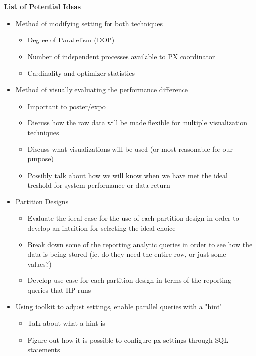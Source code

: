 \documentclass[draftclsnofoot, onecolumn, compsoc, 10pt]{IEEEtran}
\begin{document}
\textbf{List of Potential Ideas}
\begin{itemize} 
	\item  Method of modifying setting for both techniques
    \begin{itemize} 
		\item Degree of Parallelism (DOP) 
        \item Number of independent processes available to PX coordinator
        \item Cardinality and optimizer statistics
    \end{itemize}
    \item Method of visually evaluating the performance difference
    \begin{itemize} 
		\item Important to poster/expo
        \item Discuss how the raw data will be made flexible for multiple visualization techniques
        \item Discuss what visualizations will be used (or most reasonable for our purpose)
        \item Possibly talk about how we will know when we have met the ideal treshold for system performance or data return
    \end{itemize}
    \item Partition Designs
    \begin{itemize} 
		\item Evaluate the ideal case for the use of each partition design in order to develop an intuition for selecting the ideal choice
        \item Break down some of the reporting analytic queries in order to see how the data is being stored (ie. do they need the entire row, or just some values?)
        \item Develop use case for each partition design in terms of the reporting queries that HP runs
    \end{itemize}
    \item Using toolkit to adjust settings, enable parallel queries with a "hint"
    \begin{itemize}
    	\item Talk about what a hint is
        \item Figure out how it is possible to configure px settings through SQL statements
    \end{itemize}
\end{itemize}

\end{document}
